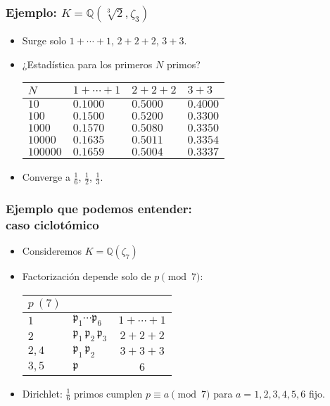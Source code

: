 \documentclass{beamer}
\newcommand{\QQ}{\mathbb{Q}}
\begin{document}
\begin{frame}[fragile]
  \frametitle{Ejemplo: $K = \QQ (\sqrt[3]{2}, \zeta_3)$}

  \begin{itemize}
  \item Surge solo $1 + \cdots + 1$, $2 + 2 + 2$, $3 + 3$.

  \item ¿Estadística para los primeros $N$ primos?
    \begin{center}
      \renewcommand{\arraystretch}{1.5}
      \begin{tabular}{lx{1.5cm}x{1.5cm}x{1.5cm}}
        $N$      & $1+\cdots+1$ & $2+2+2$ & $3+3$ \tabularnewline
        \hline
        $10$     & $0.1000$ & $0.5000$ & $0.4000$ \tabularnewline
        $100$    & $0.1500$ & $0.5200$ & $0.3300$ \tabularnewline
        $1000$   & $0.1570$ & $0.5080$ & $0.3350$ \tabularnewline
        $10000$  & $0.1635$ & $0.5011$ & $0.3354$ \tabularnewline
        $100000$ & $0.1659$ & $0.5004$ & $0.3337$ \tabularnewline
      \end{tabular}
    \end{center}

  \item Converge a $\frac{1}{6}$, $\frac{1}{2}$, $\frac{1}{3}$.
  \end{itemize}
\end{frame}


\begin{frame}[fragile]
  \frametitle{Ejemplo que podemos entender:\\
    caso ciclotómico}

  \begin{itemize}
  \item Consideremos $K = \QQ (\zeta_7)$

  \item Factorización depende solo de $p \pmod{7}$:
    \begin{center}
      \renewcommand{\arraystretch}{1.5}
      \begin{tabular}{lx{3cm}c}
        $p~(7)$ &  &  \tabularnewline
        \hline
        $1$ & $\mathfrak{p}_1\cdots\mathfrak{p}_6$ & $1+\cdots+1$ \tabularnewline
        $2$ & $\mathfrak{p}_1\,\mathfrak{p}_2\,\mathfrak{p}_3$ & $2+2+2$ \tabularnewline
        $2,4$ & $\mathfrak{p}_1\,\mathfrak{p}_2$ & $3+3+3$ \tabularnewline
        $3,5$ & $\mathfrak{p}$ & $6$ \tabularnewline
      \end{tabular}
    \end{center}

  \item Dirichlet: $\frac{1}{6}$ primos cumplen $p \equiv a \pmod{7}$
    para $a = 1,2,3,4,5,6$ fijo.
  \end{itemize}
\end{frame}
\end{document}
